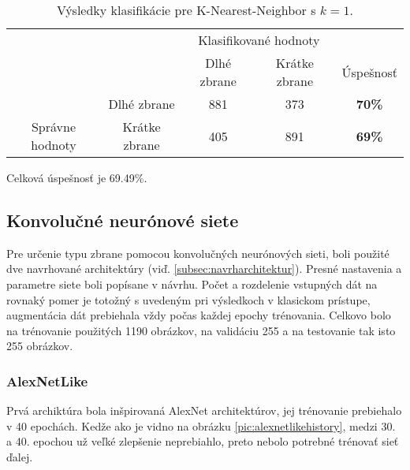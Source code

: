 \begin{table}[H]
    \centering
    \begin{tabular}{ccccc}
                                                                &                                    & \multicolumn{2}{c}{Klasifikované hodnoty}                                                         &                                    \\ \cline{3-5} 
                                                                & \multicolumn{1}{c|}{}              & \multicolumn{1}{c|}{Dlhé zbrane}                & \multicolumn{1}{c|}{Krátke zbrane}              & \multicolumn{1}{c|}{Úspešnosť}     \\ \cline{2-5} 
        \multicolumn{1}{c|}{}                                  & \multicolumn{1}{c|}{Dlhé zbrane}   & \multicolumn{1}{c|}{{\color[HTML]{009901} 881}} & \multicolumn{1}{c|}{{\color[HTML]{9A0000} 373}} & \multicolumn{1}{c|}{\textbf{70\%}} \\ \cline{2-5} 
        \multicolumn{1}{c|}{\multirow{-2}{*}{Správne hodnoty}} & \multicolumn{1}{c|}{Krátke zbrane} & \multicolumn{1}{c|}{{\color[HTML]{9A0000} 405}} & \multicolumn{1}{c|}{{\color[HTML]{009901} 891}} & \multicolumn{1}{c|}{\textbf{69\%}} \\ \cline{2-5} 
    \end{tabular}
    \caption{Výsledky klasifikácie pre K-Nearest-Neighbor s $k=1$.}
    \label{tab:kmeans1}
\end{table}
Celková úspešnosť je 69.49\%.


\subsection{Konvolučné neurónové siete}
Pre určenie typu zbrane pomocou konvolučných neurónových sieti, boli použité dve navrhované architektúry (viď. \ref{subsec:navrharchitektur}).
Presné nastavenia a parametre siete boli popísane v návrhu.
Počet a rozdelenie vstupných dát na rovnaký pomer je totožný s uvedeným pri výsledkoch v klasickom prístupe, augmentácia dát
    prebiehala vždy počas každej epochy trénovania.
Celkovo bolo na trénovanie použitých 1190 obrázkov, na validáciu 255 a na testovanie tak isto 255 obrázkov.

\subsubsection{AlexNetLike}
Prvá archiktúra bola inšpirovaná AlexNet architektúrov, jej trénovanie prebiehalo v 40 epochách.
Kedže ako je vidno na obrázku \ref{pic:alexnetlikehistory}, medzi 30. a 40. epochou už veľké zlepšenie neprebiahlo, preto nebolo potrebné trénovať sieť ďalej.

